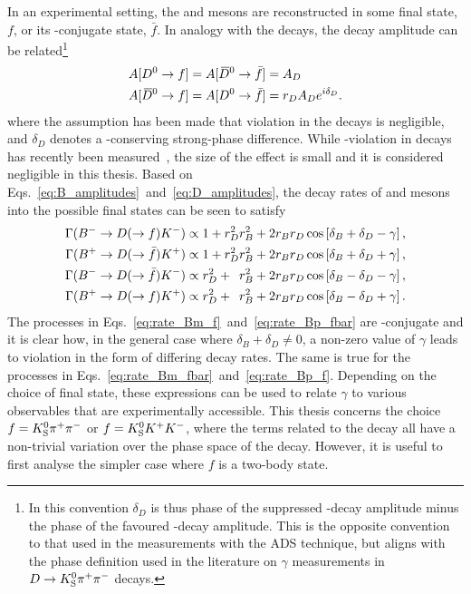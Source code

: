 In an experimental setting, the \Dz and \Dzb mesons are reconstructed in some final state, $f$, or its \CP-conjugate state, $\bar f$. In analogy with the \Bpm decays, the \D decay amplitude can be related\footnote{In this convention $\delta_D$ is thus phase of the suppressed \D-decay amplitude minus the phase of the favoured \D-decay amplitude. This is the opposite convention to that used in the \lhcb measurements with the ADS technique, but aligns with the phase definition used in the literature on $\gamma$ measurements in ${D}\rightarrow{\ensuremath{{K}^0_{\mathrm{S}}}}{\ensuremath{{\pi}^+}}{\ensuremath{{\pi}^-}}$ decays.} 
\begin{align}
\begin{split}\label{eq:D_amplitudes}
    A[{{D}^0}\rightarrow f] &= A[{{\kern 0.18em\overline{\kern -0.18em D}}{}^0}\rightarrow \bar f] = A_D \\ 
    A[{{\kern 0.18em\overline{\kern -0.18em D}}{}^0} \rightarrow f] &= A[{{D}^0} \rightarrow \bar f] = r_D A_D e^{i\delta_D}.
\end{split}
\end{align}
where the assumption has been made that \CP violation in the \D decays is negligible, and $\delta_D$ denotes a \CP-conserving strong-phase difference. While \CP-violation in \D decays has recently been measured~\cite{LHCb-PAPER-2019-006}, the size of the effect is small and it is considered negligible in this thesis. Based on Eqs.~\ref{eq:B_amplitudes}~and~\eqref{eq:D_amplitudes}, the decay rates of \Bp and \Bm mesons into the possible final states can be seen to satisfy 
\begin{subequations}\label{eq:rate_equations}
\begin{align}
    \Gamma({{{B}^-}} \rightarrow {\ensuremath{D}}(\rightarrow f){{K}^-}) & \propto 
    1 + r_D^2 r_B^2 + 2 r_B r_D \cos\left[\delta_B + \delta_D - \gamma\right], \label{eq:rate_Bm_f}\\
    \Gamma({{{B}^+}} \rightarrow {\ensuremath{D}}(\rightarrow \bar f){{K}^+}) & \propto 
    1 + r_D^2 r_B^2 + 2 r_B r_D \cos\left[\delta_B + \delta_D + \gamma\right], \label{eq:rate_Bp_fbar}\\
    \Gamma({{{B}^-}} \rightarrow {\ensuremath{D}}(\rightarrow \bar f){{K}^-}) & \propto
    r_D^2 + \phantom{1}r_B^2 + 2 r_B r_D \cos\left[\delta_B - \delta_D - \gamma\right], \label{eq:rate_Bm_fbar}\\
    \Gamma({{{B}^+}} \rightarrow {\ensuremath{D}}(\rightarrow f){{K}^+}) & \propto
    r_D^2 + \phantom{1}r_B^2 + 2 r_B r_D \cos\left[\delta_B - \delta_D + \gamma\right]. \label{eq:rate_Bp_f} 
\end{align}
\end{subequations}
The processes in Eqs.~\eqref{eq:rate_Bm_f}~and~\eqref{eq:rate_Bp_fbar} are \CP-conjugate and it is clear how, in the general case where $\delta_B+\delta_D\neq 0$,  a non-zero value of $\gamma$ leads to \CP violation in the form of differing decay rates. The same is true for the processes in Eqs.~\eqref{eq:rate_Bm_fbar}~and~\eqref{eq:rate_Bp_f}. Depending on the choice of \D final state, these expressions can be used to relate $\gamma$ to various observables that are experimentally accessible. This thesis concerns the choice $f={{K}^0_{\mathrm{S}}}{{\pi}^+}{{\pi}^-}$ or $f={{K}^0_{\mathrm{S}}}{{K}^+}{{K}^-}$, where the terms related to the \D decay all have a non-trivial variation over the phase space of the decay. However, it is useful to first analyse the simpler case where $f$ is a two-body state. 

